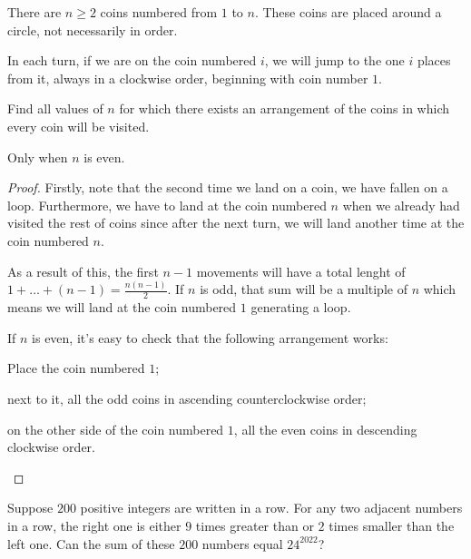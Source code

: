 \begin{problem}
  There are $n \geq 2$ coins numbered from $1$ to $n$.
  These coins are placed around a circle, not necessarily in order.

  In each turn, if we are on the coin numbered $i$,
  we will jump to the one $i$ places from it,
  always in a clockwise order, beginning with coin number $1$.

  Find all values of $n$ for which there exists an arrangement
  of the coins in which every coin will be visited.
\end{problem} 

  \begin{claim}
    Only when $n$ is even.
  \end{claim}

  \begin{proof} 
    Firstly, note that the second time we land on a coin, 
    we have fallen on a loop. 
    Furthermore, we have to land at the coin numbered $n$ 
    when we already had visited the rest of coins since after the next turn, 
    we will land another time at the coin numbered $n$. 

    As a result of this, the first $n-1$ movements 
    will have a total lenght of $1+\dots+(n-1)=\frac{n(n-1)}{2}$. 
    If $n$ is odd, that sum will be a multiple of $n$ which means 
    we will land at the coin numbered $1$ generating a loop.

    If $n$ is even, it's easy to check that the following arrangement works:

    \begin{itemize}
      \ii Place the coin numbered $1$;

      \ii next to it, all the odd coins in ascending counterclockwise order;
      
      \ii on the other side of the coin numbered $1$, all the even coins 
      in descending clockwise order.
    \end{itemize}

  \end{proof}

\begin{problem}
  Suppose $200$ positive integers are written in a row.
  For any two adjacent numbers in a row, the right one is
  either $9$ times greater than or $2$ times smaller than the left one.
  Can the sum of these $200$ numbers equal $24^{2022}$?
\end{problem}


